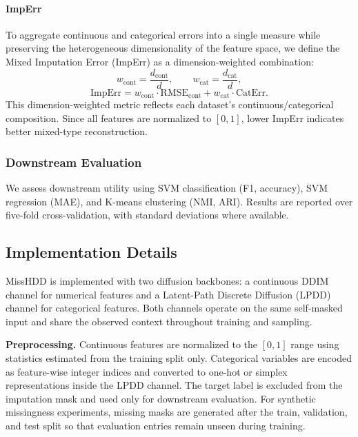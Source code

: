 \documentclass[times, review, 10pt]{elsarticle}
\newcommand{\DIFaddbegin}{\begingroup\color{blue}}
\newcommand{\DIFaddend}{\endgroup}
\begin{document}
\DIFaddbegin
\paragraph{ImpErr}
\DIFaddend
To aggregate continuous and categorical errors into a single measure while
preserving the heterogeneous dimensionality of the feature space, we define
the Mixed Imputation Error (ImpErr) as a dimension-weighted combination:
\[
w_{\mathrm{cont}} = \frac{d_{\mathrm{cont}}}{d},
\qquad
w_{\mathrm{cat}} = \frac{d_{\mathrm{cat}}}{d},
\]
\[
\mathrm{ImpErr}
=
w_{\mathrm{cont}} \cdot \mathrm{RMSE}_{\mathrm{cont}}
+
w_{\mathrm{cat}} \cdot \mathrm{CatErr}.
\]
\DIFaddbegin
This dimension-weighted metric reflects each dataset's continuous/categorical
composition. Since all features are normalized to \([0,1]\), lower ImpErr
indicates better mixed-type reconstruction.
\DIFaddend


\subsubsection{Downstream Evaluation}

\DIFaddbegin
We assess downstream utility using SVM classification (F1, accuracy), SVM
regression (MAE), and K-means clustering (NMI, ARI). Results are reported over
five-fold cross-validation, with standard deviations where available.
\DIFaddend
\subsection{Implementation Details}

MissHDD is implemented with two diffusion backbones: a continuous DDIM
channel for numerical features and a Latent-Path Discrete Diffusion (LPDD)
channel for categorical features. Both channels operate on the same
self-masked input and share the observed context throughout training and
sampling.

\DIFaddbegin
\textbf{Preprocessing.}
Continuous features are normalized to the $[0,1]$ range using statistics
estimated from the training split only. Categorical variables are encoded as
feature-wise integer indices and converted to one-hot or simplex
representations inside the LPDD channel. The target label is excluded from
the imputation mask and used only for downstream evaluation. For synthetic
missingness experiments, missing masks are generated after the train,
validation, and test split so that evaluation entries remain unseen during
training.
\end{document}
